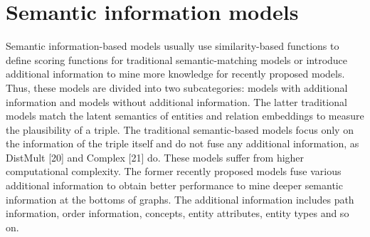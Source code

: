 




\section{Semantic information models}\label{sec:emb-semantic}
Semantic information-based models usually use similarity-based functions to define
scoring functions for traditional semantic-matching models or introduce additional information
to mine more knowledge for recently proposed models. Thus, these models are
divided into two subcategories: models with additional information and models without
additional information. The latter traditional models match the latent semantics of
entities and relation embeddings to measure the plausibility of a triple. The traditional
semantic-based models focus only on the information of the triple itself and do not fuse
any additional information, as DistMult [20] and Complex [21] do. These models suffer
from higher computational complexity. The former recently proposed models fuse various
additional information to obtain better performance to mine deeper semantic information
at the bottoms of graphs. The additional information includes path information, order
information, concepts, entity attributes, entity types and so on.


